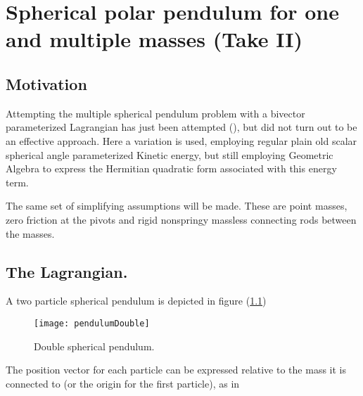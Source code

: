 

\chapter{Spherical polar pendulum for one and multiple masses (Take II)}
\label{chap:multiPendulumSpherical2}
{}
\date{Nov 4, 2009}

\beginArtWithToc

\section{Motivation}

Attempting the multiple spherical pendulum problem with a bivector parameterized Lagrangian has just been attempted (\cite{sPolarMultiPendulum}), but did not turn out to be an effective approach.  Here a variation is used, employing regular plain old scalar spherical angle parameterized Kinetic energy, but still employing Geometric Algebra to express the Hermitian quadratic form associated with this energy term.

The same set of simplifying assumptions will be made.  These are point masses, zero friction at the pivots and rigid nonspringy massless connecting rods between the masses.

\section{The Lagrangian.}

A two particle spherical pendulum is depicted in figure (\ref{fig:sPolarMultiPendulum:pendulumDouble})

\begin{figure}[htp]
\centering
\texttt{[image: pendulumDouble]}
\caption{Double spherical pendulum.}\label{fig:sPolarMultiPendulum:pendulumDouble}
\end{figure}

The position vector for each particle can be expressed relative to the mass it is connected to (or the origin for the first particle), as in

